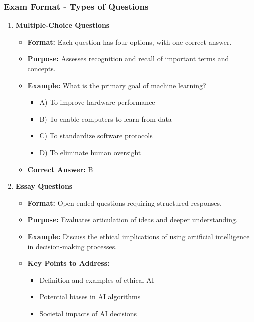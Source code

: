 \documentclass[aspectratio=169]{beamer}
\begin{document}
\begin{frame}[fragile]
    \frametitle{Exam Format - Types of Questions}
    \begin{enumerate}
        \item \textbf{Multiple-Choice Questions}
        \begin{itemize}
            \item \textbf{Format:} Each question has four options, with one correct answer.
            \item \textbf{Purpose:} Assesses recognition and recall of important terms and concepts.
            \item \textbf{Example:} What is the primary goal of machine learning?
            \begin{itemize}
                \item A) To improve hardware performance
                \item B) To enable computers to learn from data
                \item C) To standardize software protocols
                \item D) To eliminate human oversight
            \end{itemize}
            \item \textbf{Correct Answer:} B
        \end{itemize}
        
        \item \textbf{Essay Questions}
        \begin{itemize}
            \item \textbf{Format:} Open-ended questions requiring structured responses.
            \item \textbf{Purpose:} Evaluates articulation of ideas and deeper understanding.
            \item \textbf{Example:} Discuss the ethical implications of using artificial intelligence in decision-making processes.
            \item \textbf{Key Points to Address:}
            \begin{itemize}
                \item Definition and examples of ethical AI
                \item Potential biases in AI algorithms
                \item Societal impacts of AI decisions
            \end{itemize}
        \end{itemize}
    \end{enumerate}
\end{frame}
\end{document}
